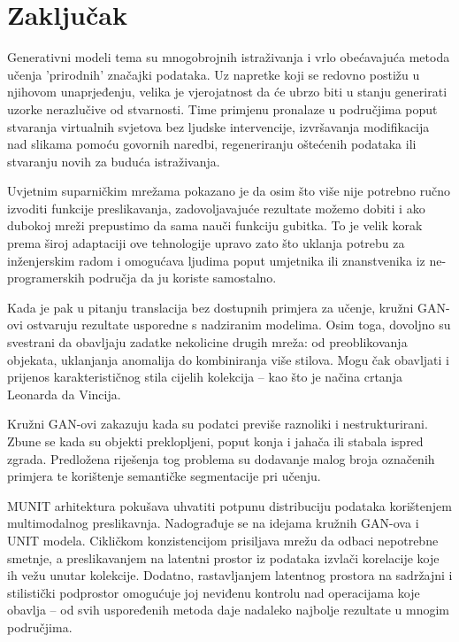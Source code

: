 \documentclass[lmodern, utf8, seminar]{fer}
\begin{document}


\chapter{Zaključak}
Generativni modeli tema su mnogobrojnih istraživanja i vrlo obećavajuća metoda učenja 'prirodnih' značajki podataka. Uz napretke koji se redovno postižu u njihovom unaprjeđenju, velika je vjerojatnost da će ubrzo biti u stanju generirati uzorke nerazlučive od stvarnosti. Time primjenu pronalaze u područjima poput stvaranja virtualnih svjetova bez ljudske intervencije, izvršavanja modifikacija nad slikama pomoću govornih naredbi, regeneriranju oštećenih podataka ili stvaranju novih za buduća istraživanja.
\newline

Uvjetnim suparničkim mrežama pokazano je da osim što više nije potrebno ručno izvoditi funkcije preslikavanja, zadovoljavajuće rezultate možemo dobiti i ako dubokoj mreži prepustimo da sama nauči funkciju gubitka. To je velik korak prema široj adaptaciji ove tehnologije upravo zato što uklanja potrebu za inženjerskim radom i omogućava ljudima poput umjetnika ili znanstvenika iz ne-programerskih područja da ju koriste samostalno.
\newline

Kada je pak u pitanju translacija bez dostupnih primjera za učenje, kružni GAN-ovi ostvaruju rezultate usporedne s nadziranim modelima. Osim toga, dovoljno su svestrani da obavljaju zadatke nekolicine drugih mreža: od preoblikovanja objekata, uklanjanja anomalija do kombiniranja više stilova. Mogu čak obavljati i prijenos karakterističnog stila cijelih kolekcija -- kao što je načina crtanja Leonarda da Vincija. 
\newline

Kružni GAN-ovi zakazuju kada su podatci previše raznoliki i nestrukturirani. Zbune se kada su objekti preklopljeni, poput konja i jahača ili stabala ispred zgrada. Predložena riješenja tog problema su dodavanje malog broja označenih primjera te korištenje semantičke segmentacije pri učenju. 


\newpage
MUNIT arhitektura pokušava uhvatiti potpunu distribuciju podataka korištenjem multimodalnog preslikavnja. Nadograđuje se na idejama kružnih GAN-ova i UNIT modela. Cikličkom konzistencijom prisiljava mrežu da odbaci nepotrebne smetnje, a preslikavanjem na latentni prostor iz podataka izvlači korelacije koje ih vežu unutar kolekcije. Dodatno, rastavljanjem latentnog prostora na sadržajni i stilistički podprostor omogućuje joj neviđenu kontrolu nad operacijama koje obavlja -- od svih uspoređenih metoda daje nadaleko najbolje rezultate u mnogim područjima.
\end{document}
